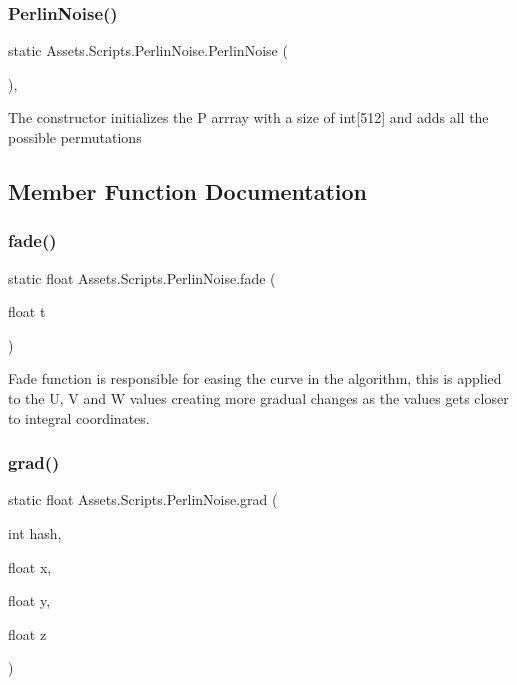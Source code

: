 \subsubsection{\texorpdfstring{PerlinNoise()}{PerlinNoise()}}
{\footnotesize\ttfamily static Assets.\+Scripts.\+Perlin\+Noise.\+Perlin\+Noise (\begin{DoxyParamCaption}{ }\end{DoxyParamCaption})\hspace{0.3cm}{\ttfamily [static]}, {\ttfamily [private]}}



The constructor initializes the P arrray with a size of int\mbox{[}512\mbox{]} and adds all the possible permutations 



\subsection{Member Function Documentation}
\mbox{\label{class_assets_1_1_scripts_1_1_perlin_noise_a6814246a684b081178e01c960a4edd96}} 
\subsubsection{\texorpdfstring{fade()}{fade()}}
{\footnotesize\ttfamily static float Assets.\+Scripts.\+Perlin\+Noise.\+fade (\begin{DoxyParamCaption}\item[{float}]{t }\end{DoxyParamCaption})\hspace{0.3cm}{\ttfamily [static]}}



Fade function is responsible for easing the curve in the algorithm, this is applied to the U, V and W values creating more gradual changes as the values gets closer to integral coordinates. 

\mbox{\label{class_assets_1_1_scripts_1_1_perlin_noise_acf602f5adb436883f20184ec6020e8b7}} 
\subsubsection{\texorpdfstring{grad()}{grad()}}
{\footnotesize\ttfamily static float Assets.\+Scripts.\+Perlin\+Noise.\+grad (\begin{DoxyParamCaption}\item[{int}]{hash,  }\item[{float}]{x,  }\item[{float}]{y,  }\item[{float}]{z }\end{DoxyParamCaption})\hspace{0.3cm}{\ttfamily [static]}}



